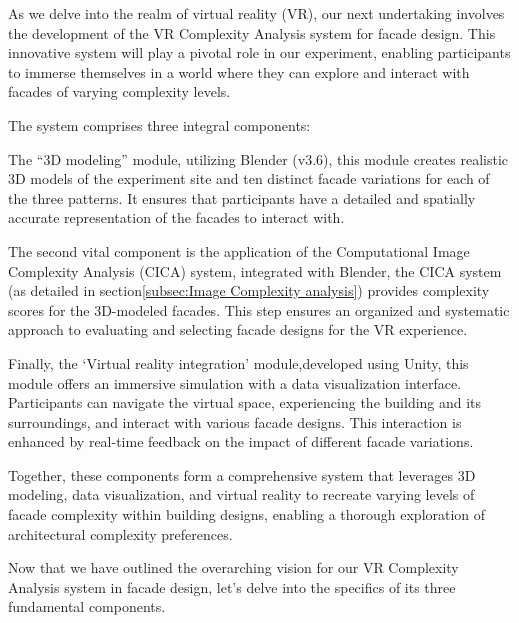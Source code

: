 As we delve into the realm of virtual reality (VR), our next undertaking involves the development of the VR Complexity Analysis system for facade design.
This innovative system will play a pivotal role in our experiment, enabling participants to immerse themselves in a world where they can explore and interact with facades of varying complexity levels.

The system comprises three integral components:

The ``3D modeling'' module, utilizing Blender (v3.6), this module creates realistic 3D models of the experiment site and ten distinct facade variations for each of the three patterns.
It ensures that participants have a detailed and spatially accurate representation of the facades to interact with.

The second vital component is the application of the Computational Image Complexity Analysis (CICA) system, integrated with Blender, the CICA system (as detailed in section\ref{subsec:Image Complexity analysis}) provides complexity scores for the 3D-modeled facades.
This step ensures an organized and systematic approach to evaluating and selecting facade designs for the VR experience.

Finally, the `Virtual reality integration' module,developed using Unity, this module offers an immersive simulation with a data visualization interface.
Participants can navigate the virtual space, experiencing the building and its surroundings, and interact with various facade designs.
This interaction is enhanced by real-time feedback on the impact of different facade variations.

Together, these components form a comprehensive system that leverages 3D modeling, data visualization, and virtual reality to recreate varying levels of facade complexity within building designs, enabling a thorough exploration of architectural complexity preferences.

Now that we have outlined the overarching vision for our VR Complexity Analysis system in facade design, let's delve into the specifics of its three fundamental components.

